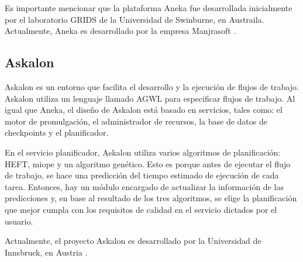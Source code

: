 Es importante mencionar que la plataforma Aneka fue desarrollada inicialmente por el laboratorio GRIDS de la Universidad de Swinburne, en Austraila. Actualmente, Aneka es desarrollado por la empresa Manjrasoft \cite{aneka2014webpage}.

\subsection{Askalon}

Askalon \cite{fahringer2005askalon} es un entorno que facilita el desarrollo y la ejecución de flujos de trabajo. Askalon utiliza un lenguaje llamado AGWL para especificar flujos de trabajo. Al igual que Aneka, el diseño de Askalon está basado en servicios, tales como: el motor de promulgación, el administrador de recursos, la base de datos de checkpoints y el planificador.

En el servicio planificador, Askalon utiliza varios algoritmos de planificación: HEFT, miope y un algoritmo genético. Esto es porque antes de ejecutar el flujo de trabajo, se hace una predicción del tiempo estimado de ejecución de cada tarea. Entonces, hay un módulo encargado de actualizar la información de las predicciones y, en base al resultado de los tres algoritmos, se elige la planificación que mejor cumpla con los requisitos de calidad en el servicio dictados por el usuario.

Actualmente, el proyecto Askalon es desarrollado por la Universidad de Innsbruck, en Austria \cite{askalon2014webpage}.